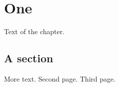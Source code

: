 \documentclass{book}
\begin{document}
\chapter{One}
Text of the chapter.
\section{A section}
More text.
\newpage
Second page.
\newpage
Third page.
\end{document}
